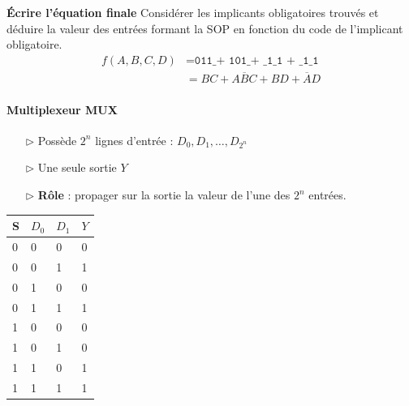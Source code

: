 \documentclass{report}
\begin{document}
\begin{multicols*}{3}
    \noindent 
    \textbf{Écrire l'équation finale}  
    Considérer les implicants obligatoires trouvés et déduire la valeur des entrées 
    formant la SOP en fonction du code de l'implicant obligatoire. 
    \begin{align*}
      f(A, B, C, D) &= \texttt{011\_ + 101\_ + \_1\_1 + \_1\_1} \\ 
                    &= BC + A\overline{B}C + BD + \overline{A}D
    \end{align*}

    \paragraph{Multiplexeur MUX}
    \begin{itemize}
      \item [$\rhd$ ] Possède $2^n$ lignes d'entrée : $D_0, D_1, \dots, D_{2^n}$
      \item [$\rhd$ ] Une seule sortie $Y$ 
      \item[$\rhd$ ] \textbf{Rôle} : propager sur la sortie la valeur de l'une des $2^n$ entrées.   
    \end{itemize}


    \begin{table}[H]
      \begin{center}
        \renewcommand{\arraystretch}{1.15}
        \selectfont
        \footnotesize
            \begin{tabular}{l l l |l}
            \arrayrulecolor{blue}\hline
            \rowcolor{lightBlue}
            \textcolor{myb}{S} & \textcolor{myb}{$D_0$} &  
            \textcolor{myb}{$D_1$} & \textcolor{myb}{$Y$}
            \\
            \hline
            \arrayrulecolor{black}
            0 & 0 & 0 & 0 
            \\
            \hline
            0 & 0 & 1 & 1   
            \\
            \hline
            0 & 1 & 0 & 0 
            \\ 
            \hline 
            0 & 1 & 1 & 1   
            \\ 
            \hline 
              1 & 0 & 0 & 0 
            \\ 
            \hline           
             1 & 0 & 1 & 0 
            \\ 
            \hline            
            1 & 1 & 0 & 1 
            \\ 
            \hline 
            1 & 1 & 1 & 1 
            \\ 
            \hline 
                \end{tabular}
    \end{center}
    \end{table}


\end{multicols*}
\end{document}
